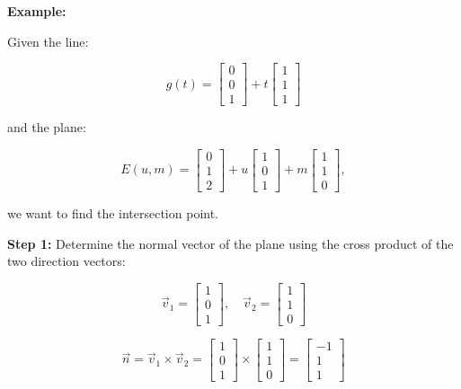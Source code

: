 \textbf{Example:}

Given the line:

\[
	g(t) = \begin{bmatrix} 0 \\ 0 \\ 1 \end{bmatrix} + t \begin{bmatrix} 1 \\ 1 \\ 1 \end{bmatrix}
\]

and the plane:

\[
	E(u, m) = \begin{bmatrix} 0 \\ 1 \\ 2 \end{bmatrix} + u \begin{bmatrix} 1 \\ 0 \\ 1 \end{bmatrix} + m \begin{bmatrix} 1 \\ 1 \\ 0 \end{bmatrix},
\]

we want to find the intersection point.

\textbf{Step 1:} Determine the normal vector of the plane using the cross product of the two direction vectors:

\[
	\vec{v}_1 = \begin{bmatrix} 1 \\ 0 \\ 1 \end{bmatrix}, \quad \vec{v}_2 = \begin{bmatrix} 1 \\ 1 \\ 0 \end{bmatrix}
\]

\[
	\vec{n} = \vec{v}_1 \times \vec{v}_2 =
	\begin{bmatrix} 1 \\ 0 \\ 1 \end{bmatrix} \times \begin{bmatrix} 1 \\ 1 \\ 0 \end{bmatrix} =
	\begin{bmatrix} -1 \\ 1 \\ 1 \end{bmatrix}
\]

